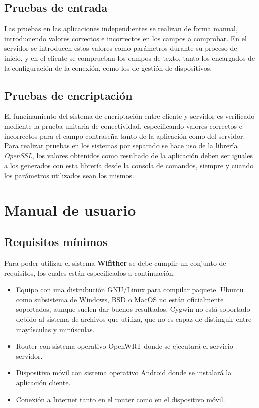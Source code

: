 \documentclass[12pt]{article}
\begin{document}
    \subsection{Pruebas de entrada}
    Las pruebas en las aplicaciones independientes se realizan de forma manual, introduciendo valores correctos e incorrectos en los campos a comprobar. En el servidor se introducen estos valores como parámetros durante su proceso de inicio, y en el cliente se comprueban los campos de texto, tanto los encargados de la configuración de la conexión, como los de gestión de dispositivos.

    \subsection{Pruebas de encriptación}
    El funcinamiento del sistema de encriptación entre cliente y servidor es verificado mediente la prueba unitaria de conectividad, especificando valores correctos e incorrectos para el campo contraseña tanto de la aplicación como del servidor. Para realizar pruebas en los sistemas por separado se hace uso de la librería \textit{OpenSSL}, los valores obtenidos como resultado de la aplicación deben ser iguales a los generados con esta librería desde la consola de comandos, siempre y cuando los parámetros utilizados sean los mismos. 

\section{Manual de usuario}
    \subsection{Requisitos mínimos}
        Para poder utilizar el sistema \textbf{Wifither} se debe cumplir un conjunto de requisitos, los cuales están especificados a continuación.

        \begin{itemize}
            \item Equipo con una distrubución GNU/Linux para compilar paquete. Ubuntu como subsistema de Windows, BSD o MacOS no están oficialmente soportados, aunque suelen dar buenos resultados. Cygwin no está soportado debido al sistema de archivos que utiliza, que no es capaz de distinguir entre mayúsculas y minúsculas.
            \item Router con sistema operativo OpenWRT donde se ejecutará el servicio servidor.
            \item Dispositivo móvil con sistema operativo Android donde se instalará la aplicación cliente.
            \item Conexión a Internet tanto en el router como en el dispositivo móvil.
        \end{itemize}
\end{document}
